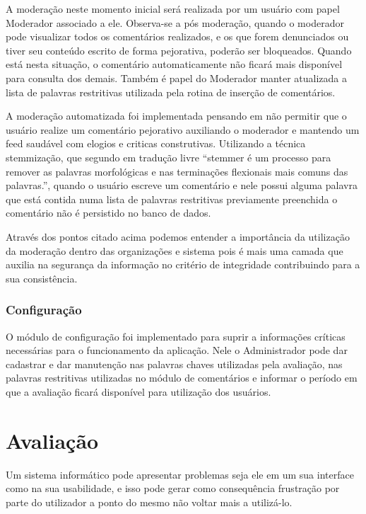 \documentclass[12pt, a4paper]{report}
\begin{document}
A moderação neste momento inicial será realizada por um usuário com papel Moderador associado a ele. Observa-se a pós moderação, quando o moderador pode visualizar todos os comentários realizados, e os que forem denunciados ou tiver seu conteúdo escrito de forma pejorativa, poderão ser bloqueados. Quando está nesta situação, o comentário automaticamente não ficará mais disponível para consulta dos demais. Também é papel do Moderador manter atualizada a lista de palavras restritivas utilizada pela rotina de inserção de comentários. 


A moderação automatizada foi implementada pensando em não permitir que o usuário realize um comentário pejorativo auxiliando o moderador e mantendo um feed saudável com elogios e criticas construtivas. Utilizando a técnica stemmização, que segundo \cite{porter1980} em tradução livre “stemmer é um processo para remover as palavras morfológicas e nas terminações flexionais mais comuns das palavras.”, quando o usuário escreve um comentário e nele possui alguma palavra que está contida numa lista de palavras restritivas previamente preenchida o comentário não é persistido no banco de dados.  

Através dos pontos citado acima podemos entender a importância da utilização da moderação dentro das organizações e sistema pois é  mais uma camada que auxilia na segurança da informação no critério de integridade contribuindo para a sua consistência.

\subsection{Configuração}
O módulo de configuração foi implementado para suprir a  informações críticas necessárias para o funcionamento da aplicação. Nele o Administrador pode dar cadastrar e dar manutenção nas palavras chaves utilizadas pela avaliação, nas palavras restritivas utilizadas no módulo de comentários e informar o período em que a avaliação ficará disponível para utilização dos usuários.

\chapter{Avaliação}

Um sistema informático pode apresentar problemas seja ele em um sua interface como na sua usabilidade, e isso pode gerar como consequência frustração por parte do utilizador a ponto do mesmo não voltar mais a utilizá-lo.
\end{document}
